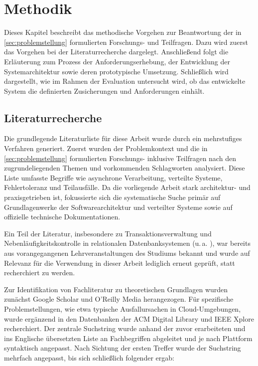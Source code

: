 
\chapter{Methodik}
\label{ch:methodik}
Dieses Kapitel beschreibt das methodische Vorgehen zur Beantwortung der in \cref{sec:problemstellung} formulierten
Forschungs- und Teilfragen.
Dazu wird zuerst das Vorgehen bei der Literaturrecherche dargelegt.
Anschließend folgt die Erläuterung zum Prozess der Anforderungserhebung, der Entwicklung der
Systemarchitektur sowie deren prototypische Umsetzung.
Schließlich wird dargestellt, wie im Rahmen der Evaluation untersucht wird, ob das entwickelte System die
definierten Zusicherungen und Anforderungen einhält.

\section{Literaturrecherche}
\label{sec:literaturrecherche}
Die grundlegende Literaturliste für diese Arbeit wurde durch ein mehrstufiges Verfahren generiert.
Zuerst wurden der Problemkontext und die in \cref{sec:problemstellung} formulierten Forschungs- inklusive Teilfragen nach
den zugrundeliegenden Themen und vorkommenden Schlagworten analysiert.
Diese Liste umfasste Begriffe wie asynchrone Verarbeitung, verteilte Systeme, Fehlertoleranz und Teilausfälle.
Da die vorliegende Arbeit stark architektur- und praxisgetrieben ist, fokussierte sich die systematische Suche primär
auf Grundlagenwerke der Softwarearchitektur und verteilter Systeme sowie auf offizielle technische Dokumentationen.

Ein Teil der Literatur, insbesondere zu Transaktionsverwaltung und Nebenläufigkeitskontrolle in
relationalen Datenbanksystemen (u.\,a. \textcite{saake_datenbanken_2018}), war bereits aus vorangegangenen
Lehrveranstaltungen des Studiums bekannt und wurde auf Relevanz für die Verwendung in dieser Arbeit lediglich erneut geprüft,
statt recherchiert zu werden.

Zur Identifikation von Fachliteratur zu theoretischen Grundlagen wurden zunächst Google Scholar und O'Reilly Media herangezogen.
Für spezifische Problemstellungen, wie etwa typische Ausfallursachen in Cloud-Umgebungen, wurde ergänzend in den
Datenbanken der ACM Digital Library und IEEE Xplore recherchiert.
Der zentrale Suchstring wurde anhand der zuvor erarbeiteten und ins Englische übersetzten Liste an Fachbegriffen abgeleitet
und je nach Plattform syntaktisch angepasst.
Nach Sichtung der ersten Treffer wurde der Suchstring mehrfach angepasst, bis sich schließlich folgender ergab:

